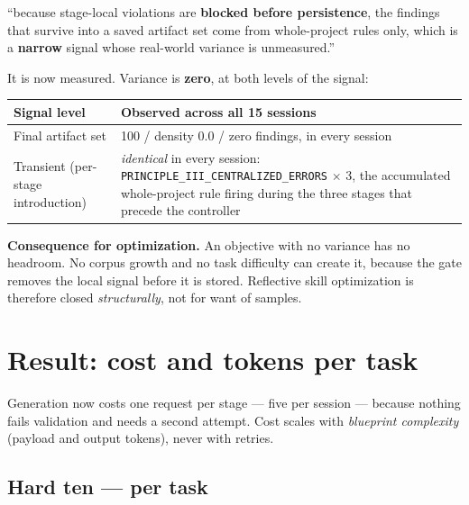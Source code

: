 \documentclass[11pt,a4paper]{article}
\begin{document}
\begin{notebox}
``because stage-local violations are \textbf{blocked before persistence}, the
findings that survive into a saved artifact set come from whole-project rules only,
which is a \textbf{narrow} signal whose real-world variance is unmeasured.''
\end{notebox}

It is now measured. Variance is \textbf{zero}, at both levels of the signal:

\begin{center}
\begin{tabular}{@{}p{}p{}@{}}
\toprule
\textbf{Signal level} & \textbf{Observed across all 15 sessions} \\
\midrule
Final artifact set & 100 / density 0.0 / zero findings, in every session \\
Transient (per-stage introduction) & \emph{identical} in every session:
\texttt{PRINCIPLE\_III\_CENTRALIZED\_ERRORS} $\times$ 3, the accumulated whole-project
rule firing during the three stages that precede the controller \\
\bottomrule
\end{tabular}
\end{center}

\textbf{Consequence for optimization.} An objective with no variance has no
headroom. No corpus growth and no task difficulty can create it, because the gate
removes the local signal before it is stored. Reflective skill optimization is
therefore closed \emph{structurally}, not for want of samples.

\section{Result: cost and tokens per task}

Generation now costs one request per stage --- five per session --- because nothing
fails validation and needs a second attempt. Cost scales with \emph{blueprint
complexity} (payload and output tokens), never with retries.

\subsection{Hard ten --- per task}
\end{document}
